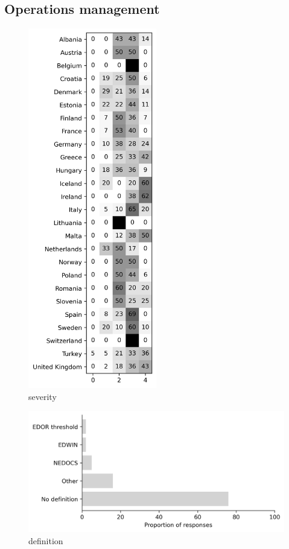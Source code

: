 \documentclass{article}
\begin{document}
\subsection{Operations management}
\lipsum[4-6]

\begin{figure}[H]
    \centering
        \includegraphics[width=0.5\textwidth]{../output/plots/severity}
        \caption{severity}
        \label{fig:severity}
\end{figure}

\begin{figure}[H]
    \centering
        \includegraphics[width=1.0\textwidth]{../output/plots/definition}
        \caption{definition}
        \label{fig:definition}
\end{figure}
\end{document}
